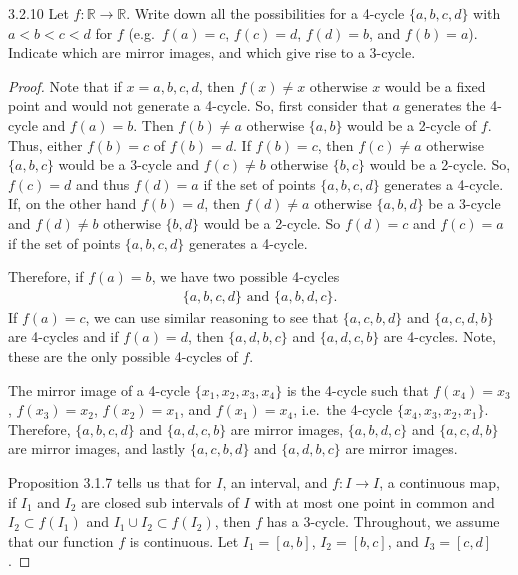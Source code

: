 \begin{problem}{3.2.10}
  Let $f : \mathbb{R} \to  \mathbb{R}$. Write down all the possibilities for a 4-cycle
  $\{a, b, c, d\}$ with $a < b < c < d$ for $f$
  (e.g.\ $f (a) = c$, $f (c) = d$, $f (d) = b$, and $f (b) = a$).
  Indicate which are mirror images, and which give rise to a 3-cycle.
\end{problem}

\begin{proof}
  Note that if $x = a,b,c,d$, then $f(x) \neq x$ otherwise $x$ would be a fixed
  point and would not generate a 4-cycle. So, first consider that $a$ generates the 4-cycle
  and $f(a) = b$. Then $f(b) \neq a$ otherwise $\{a, b\}$ would be a 2-cycle of $f$.
  Thus, either $f(b) = c$ of $f(b) = d$. If $f(b) = c$, then $f(c) \neq a$ otherwise $\{a, b, c\}$
  would be a 3-cycle and $f(c) \neq b$ otherwise $\{b, c\}$ would be a 2-cycle. So, $f(c) = d$
  and thus $f(d) = a$ if the set of points $\{a,b,c,d\}$ generates a 4-cycle. If, on
  the other hand $f(b) = d$, then $f(d) \neq a$ otherwise $\{a,b,d\}$ be a 3-cycle
  and $f(d) \neq b$ otherwise $\{b, d\}$ would be a 2-cycle. So $f(d) = c$ and $f(c) = a$
  if the set of points $\{a,b,c,d\}$ generates a 4-cycle.

  Therefore, if $f(a) = b$, we have two possible 4-cycles
  \begin{align*}
    \{a,b,c,d\} \text{  and  } \{a,b,d,c\}.
  \end{align*}
  If $f(a) = c$, we can use similar reasoning to see that $\{a,c,b,d\}$ and $\{a,c,d,b\}$
  are 4-cycles and if $f(a) = d$, then $\{a,d,b,c\}$ and $\{a,d,c,b\}$ are 4-cycles.
  Note, these are the only possible 4-cycles of $f$.

  The mirror image of a 4-cycle $\{x_1, x_2, x_3, x_4\}$ is the 4-cycle such
  that $f(x_4) = x_3$, $f(x_3) = x_2$, $f(x_2) = x_1$, and $f(x_1) = x_4$, i.e.\
  the 4-cycle $\{x_4, x_3, x_2, x_1\}$. Therefore,
  $\{a,b,c,d\}$ and $\{a,d,c,b\}$ are mirror images, $\{a,b,d,c\}$ and $\{a,c,d,b\}$ are mirror images,
  and lastly $\{a,c,b,d\}$ and $\{a,d,b,c\}$ are mirror images.

  Proposition 3.1.7 tells us that for $I$, an interval, and $f : I \to I$, a continuous map,
  if $I_1$ and $I_2$ are closed sub intervals of $I$ with at most one point in common
  and $I_2 \subset f(I_1)$ and $I_1 \cup I_2 \subset f(I_2)$, then $f$ has a 3-cycle.
  Throughout, we assume that our function $f$ is continuous. Let $I_1 = [a,b]$, $I_2=[b,c]$,
  and $I_3 = [c,d]$.


\end{proof}
